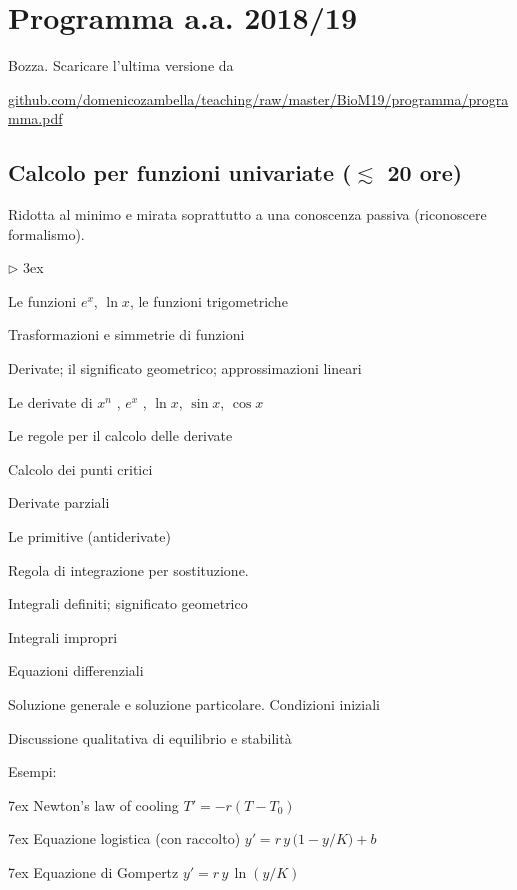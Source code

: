 \documentclass[10pt]{article}
\newcommand{\mylabel}[1]{#1\hfill}
\renewenvironment{itemize}
  {\begin{list}{$\triangleright$}{%
   \baselineskip3ex
   \setlength{\parskip}{4mm}
   \setlength{\topsep}{.4\baselineskip}
   \setlength{\rightmargin}{0mm}
   \setlength{\listparindent}{0mm}
   \setlength{\itemindent}{0mm}
   \setlength{\labelwidth}{2ex}
   \setlength{\itemsep}{.4\baselineskip}
   \setlength{\parsep}{0mm}
   \setlength{\partopsep}{0mm}
   \setlength{\labelsep}{1ex}
   \setlength{\leftmargin}{\labelwidth+\labelsep}
   \let\makelabel\mylabel}}{%
   \end{list}\vspace*{-1.3mm}}
\begin{document}
\section{Programma a.a. 2018/19}

Bozza. Scaricare l'ultima versione da\smallskip

\href{https://github.com/domenicozambella/teaching/raw/master/BioM19/programma/programma.pdf}{\small github.com/domenicozambella/teaching/raw/master/BioM19/programma/programma.pdf}



\subsection{Calcolo per funzioni univariate (\boldmath$\lesssim$ 20 ore)}

\colorbox{blue!10}{\begin{minipage}{\textwidth}
Ridotta al minimo e mirata soprattutto a una conoscenza passiva (riconoscere formalismo). 
\end{minipage}}



\begin{itemize}
\item Le funzioni $e^x$, $\ln x$, le funzioni trigometriche

\item Trasformazioni e simmetrie di funzioni

\item Derivate; il significato geometrico; approssimazioni lineari

      Le derivate di $x^n$ , $e^x$ , $\ln x$, $\sin x$, $\cos x$\hfill{}

      Le regole per il calcolo delle derivate\hfill{}
      
      Calcolo dei punti critici

      Derivate parziali\hfill{}
      
\item Le primitive (antiderivate)

Regola di integrazione per sostituzione.\hfill{}

Integrali definiti; significato geometrico

Integrali impropri

\item Equazioni differenziali \hfill{}

  Soluzione generale e soluzione particolare. Condizioni iniziali
  
  Discussione qualitativa di equilibrio e stabilità
  
  Esempi:\hfill{} 
  
  \noindent\kern7ex Newton's law of cooling $T' = -r(T-T_0)$
  
  \noindent\kern7ex Equazione logistica (con raccolto) $y' = r\, y\,\big(1- y/K\big) + b$
  
  \noindent\kern7ex Equazione di Gompertz $y' = r\, y\,\ln(y/K)$
\end{itemize}
\end{document}
